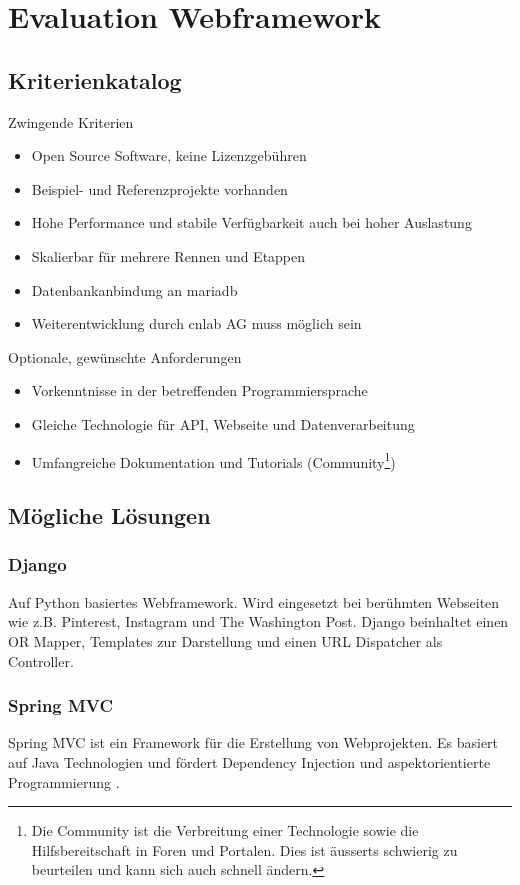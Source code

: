 \section{Evaluation Webframework}
\label{sec:evaluationwebframework}
\subsection{Kriterienkatalog}
Zwingende Kriterien
\begin{itemize}
\item Open Source Software, keine Lizenzgebühren
\item Beispiel- und Referenzprojekte vorhanden
\item Hohe Performance und stabile Verfügbarkeit auch bei hoher Auslastung
\item Skalierbar für mehrere Rennen und Etappen
\item Datenbankanbindung an \gls{mariadb}
\item Weiterentwicklung durch cnlab AG muss möglich sein
\end{itemize}
Optionale, gewünschte Anforderungen
\begin{itemize}
\item Vorkenntnisse in der betreffenden Programmiersprache
\item Gleiche Technologie für API, Webseite und Datenverarbeitung
\item Umfangreiche Dokumentation und Tutorials (Community\footnote{Die Community ist die Verbreitung einer Technologie sowie die Hilfsbereitschaft in Foren und Portalen. Dies ist äusserts schwierig zu beurteilen und kann sich auch schnell ändern.})
\end{itemize}
\subsection{Mögliche Lösungen}
\subsubsection{Django}
Auf Python basiertes Webframework. Wird eingesetzt bei berühmten Webseiten wie z.B. Pinterest, Instagram und The Washington Post.  Django beinhaltet einen OR Mapper, Templates zur Darstellung und einen URL Dispatcher als Controller.
\subsubsection{Spring MVC}
Spring MVC ist ein Framework für die Erstellung von Webprojekten. Es basiert auf Java Technologien und fördert Dependency Injection  und aspektorientierte Programmierung .
